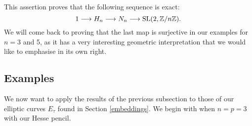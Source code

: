 This assertion proves that the following sequence is exact:
\begin{equation*}
	1 \longrightarrow H_{n} \longrightarrow N_{n} \longrightarrow \operatorname{SL}(2,\mathbb{Z}/n\mathbb{Z}).
\end{equation*}
We will come back to proving that the last map is surjective in our examples for $n = 3$ and 5, as it has a very interesting geometric interpretation that we would like to emphasise in its own right.

\subsection{Examples}

We now want to apply the results of the previous subsection to those of our elliptic curves $E_{\tau}$ found in Section \ref{embeddings}. We begin with when $n = p = 3$ with our Hesse pencil.

